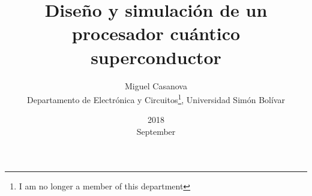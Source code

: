 \title{Diseño y simulación de un procesador cuántico superconductor}
\date{2018\\ September}
\author{Miguel Casanova\\ Departamento de Electrónica y Circuitos\thanks{I am no longer a member of this department}, Universidad Simón Bolívar}
